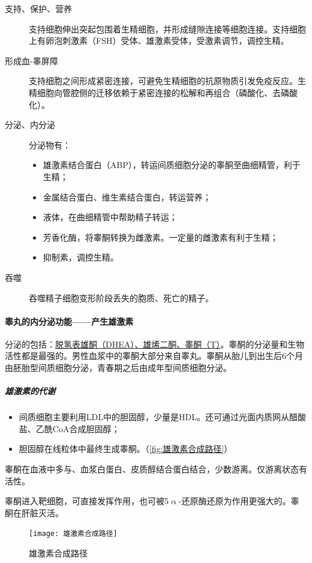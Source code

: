 \begin{description}
	\item[支持、保护、营养] 支持细胞伸出突起包围着生精细胞，并形成缝隙连接等细胞连接。支持细胞上有卵泡刺激素（FSH）受体、雄激素受体，受激素调节，调控生精。
	\item[形成血-睾屏障] 支持细胞之间形成紧密连接，可避免生精细胞的抗原物质引发免疫反应。生精细胞向管腔侧的迁移依赖于紧密连接的松解和再组合（磷酸化、去磷酸化）。
	\item[分泌、内分泌] 分泌物有：\begin{itemize}
		\item 雄激素结合蛋白（ABP），转运间质细胞分泌的睾酮至曲细精管，利于生精；
		\item 金属结合蛋白、维生素结合蛋白，转运营养；
		\item 液体，在曲细精管中帮助精子转运；
		\item 芳香化酶，将睾酮转换为雌激素。一定量的雌激素有利于生精；
		\item 抑制素，调控生精。
	\end{itemize}
	\item[吞噬] 吞噬精子细胞变形阶段丢失的胞质、死亡的精子。
\end{description}

\paragraph{睾丸的内分泌功能——产生雄激素}

分泌的包括：\uline{脱氢表雄酮（DHEA）、雄烯二酮、睾酮（T）}。睾酮的分泌量和生物活性都是最强的。男性血浆中的睾酮大部分来自睾丸。睾酮从胎儿到出生后6个月由胚胎型间质细胞分泌，青春期之后由成年型间质细胞分泌。

\subparagraph{雄激素的代谢}

\begin{itemize}
	\item 间质细胞主要利用LDL中的胆固醇，少量是HDL。还可通过光面内质网从醋酸盐、乙酰CoA合成胆固醇；
	\item 胆固醇在线粒体中最终生成睾酮。（\autoref{fig:雄激素合成路径}）
\end{itemize}

睾酮在血液中多与、血浆白蛋白、皮质醇结合蛋白结合，少数游离。仅游离状态有活性。

睾酮进入靶细胞，可直接发挥作用，也可被5$\upalpha$-还原酶还原为作用更强大的。睾酮在肝脏灭活。

\begin{figure}[htbp]
	\centering
	\texttt{[image: 雄激素合成路径]}
	\caption{雄激素合成路径}
	\label{fig:雄激素合成路径}
\end{figure}

